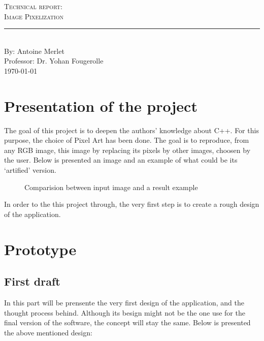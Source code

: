 \documentclass[aps,letterpaper,11pt]{revtex4}
\newcommand{\labno}{Technical report}
\newcommand{\labtitle}{Image Pixelization}
\newcommand{\authorname}{Antoine Merlet}
\newcommand{\professor}{Dr. Yohan Fougerolle}
\begin{document}
  
\begin{titlepage}
\begin{center}
{\LARGE \textsc{\labno:} \\ \vspace{4pt}}
{\Large \textsc{\labtitle} \\ \vspace{4pt}} 
\rule[13pt]{\textwidth}{1pt} \\ \vspace{150pt}
{\large By: \authorname \\ \vspace{10pt}
Professor: \professor \\ \vspace{10pt}
\today}
\end{center}




\end{titlepage}%
\newpage
\tableofcontents
\newpage

\section{Presentation of the project}
The goal of this project is to deepen the authors' knowledge about C++. For this purpose, the choice of Pixel Art has been done. The goal is to reproduce, from any RGB image, this image by replacing its pixels by other images, choosen by the user. Below is presented an image and an example of what could be its `artified' version.

\begin{figure}[H]
    \centering
    \qquad
    \caption{Comparision between input image and a result example}
    \label{fig:example}%
\end{figure}

In order to the this project through, the very first step is to create a rough design of the application.

\section{Prototype}
\subsection{First draft}

In this part will be prensente the very first design of the application, and the thought process behind. Although its besign might not be the one use for the final version of the software, the concept will stay the same.
Below is presented the above mentioned design: 
\end{document}
